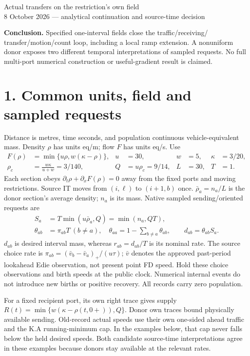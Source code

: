 \documentclass[11pt,a4paper]{article}
\begin{document}
\begin{center}
{\Large Actual transfers on the restriction's own field}\\[4pt]
8 October 2026 --- analytical continuation and source-time decision
\end{center}
\textbf{Conclusion.} Specified one-interval fields close the traffic/receiving/
transfer/motion/count loop, including a local ramp extension. A nonuniform
donor exposes two different temporal interpretations of sampled requests.
No full multi-port numerical construction or useful-gradient result is claimed.

\section*{1. Common units, field and sampled requests}
Distance is metres, time seconds, and population continuous vehicle-equivalent
mass. Density $\rho$ has units eq/m; flow $F$ has units eq/s. Use
\begin{align}
 F(\rho)&=\min\{u\rho,w(\kappa-\rho)\},&
 u&=30,& w&=5,& \kappa&=3/20,\\
 \rho_c&=\frac{w\kappa}{u+w}=3/140,&
 Q&=u\rho_c=9/14,& L&=30,& T&=1.
\end{align}
Each section obeys $\partial_t\rho+\partial_xF(\rho)=0$ away from the
fixed ports and moving restrictions. Source IT moves from $(i,\ell)$ to
$(i+1,b)$ once. $\bar\rho_a=n_a/L$ is the donor section's average density;
$n_a$ is its mass. Native sampled sending/oriented requests are
\begin{align}
 S_a&=T\min(u\bar\rho_a,Q)=\min(n_a,QT),\\
 \theta_{ab}&=\pi_{ab}T\ (b\ne a),\quad
 \theta_{aa}=1-\sum_{b\ne a}\theta_{ab},\qquad d_{ab}=\theta_{ab}S_a.
\end{align}
$d_{ab}$ is desired interval mass, whereas $r_{ab}=d_{ab}/T$ is its nominal
rate. The source choice rate is $\pi_{ab}=(\bar v_b-\bar v_a)_+/(u\tau)$;
$\bar v$ denotes the approved past-period lookahead Edie observation, not
present point FD speed. Hold these choice observations and birth speeds at
the public clock. Numerical internal events do not introduce new births or
positive recovery. All records carry zero population.

For a fixed recipient port, its own right trace gives supply
$R(t)=\min\{w(\kappa-\rho(t,0+)),Q\}$. Donor own traces bound physically
available sending. Old-record actual speeds use their own one-sided ahead
traffic and the K.A running-minimum cap. In the examples below, that cap never
falls below the held desired speeds. Both candidate source-time interpretations
agree in these examples because donors stay available at the relevant rates.
\end{document}
